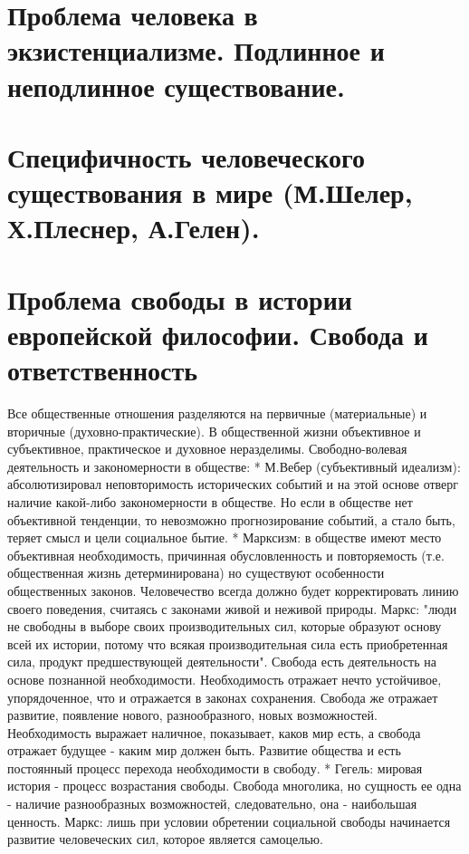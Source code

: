 \documentclass[12pt]{article}
\begin{document}
\newpage
\section{Проблема человека в экзистенциализме. Подлинное и неподлинное существование.}


\newpage
\section{Специфичность человеческого существования в мире (М.Шелер, Х.Плеснер, А.Гелен). }


\newpage
\section{Проблема свободы в истории европейской философии. Свобода и ответственность}
Все общественные отношения разделяются на первичные (материальные) и вторичные (духовно-практические).
В общественной жизни объективное и субъективное, практическое и духовное неразделимы.
Свободно-волевая деятельность и закономерности в обществе:
   * М.Вебер (субъективный идеализм): абсолютизировал неповторимость исторических событий и на этой
основе отверг наличие какой-либо закономерности в обществе. Но если в обществе нет объективной тенденции,
то невозможно прогнозирование событий, а стало быть, теряет смысл и цели социальное бытие.
    *  Марксизм:  в  обществе  имеют  место  объективная  необходимость,  причинная  обусловленность  и
повторяемость (т.е. общественная жизнь детерминирована) но существуют особенности общественных законов.
Человечество  всегда должно  будет корректировать  линию своего поведения, считаясь с законами  живой  и
неживой природы. Маркс: "люди не свободны в выборе своих производительных сил, которые образуют основу
всей их истории, потому что всякая производительная сила есть приобретенная сила, продукт предшествующей
деятельности". Свобода есть деятельность на основе познанной необходимости. Необходимость отражает нечто
устойчивое, упорядоченное, что и отражается в законах сохранения. Свобода же отражает развитие, появление
нового, разнообразного, новых возможностей. Необходимость выражает наличное, показывает, каков мир есть,
а свобода отражает будущее - каким мир должен быть. Развитие общества и есть постоянный процесс перехода
необходимости в свободу.
* Гегель: мировая история - процесс возрастания свободы. Свобода многолика, но сущность ее одна - наличие
разнообразных возможностей, следовательно, она - наибольшая ценность. Маркс: лишь при условии обретении
социальной свободы начинается развитие человеческих сил, которое является самоцелью.
\end{document}
